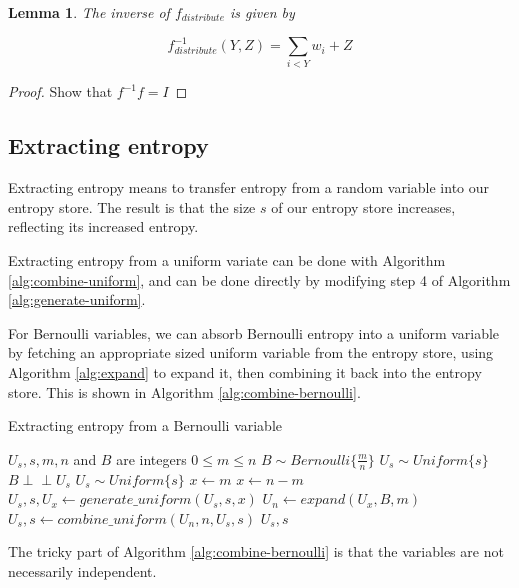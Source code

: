 \documentclass[12pt]{article}
\newtheorem{lemma}{Lemma}
\newcommand{\indep}{\perp\!\!\!\perp}
\begin{document}
\begin{lemma}
The inverse of $f_{distribute}$ is given by

    \begin{equation}
    f^{-1}_{distribute}(Y,Z) = \sum_{i<Y}w_i + Z
    \end{equation}
\end{lemma}

\begin{proof}
    Show that $f^{-1}f= I$

\end{proof}

\subsection {Extracting entropy}

Extracting entropy means to transfer entropy from a random variable into our entropy store. The result is that the size $s$ of our entropy store increases, reflecting its increased entropy.

Extracting entropy from a uniform variate can be done with Algorithm \ref{alg:combine-uniform}, and can be done directly by modifying step 4 of Algorithm \ref{alg:generate-uniform}.

For Bernoulli variables, we can absorb Bernoulli entropy into a uniform variable by fetching an appropriate sized uniform variable from the entropy store, using Algorithm \ref{alg:expand} to expand it, then combining it back into the entropy store. This is shown in Algorithm \ref{alg:combine-bernoulli}.

\begin{algorithm}
\caption{Extracting entropy from a Bernoulli variable}
\label{alg:combine-bernoulli}
\begin{algorithmic}[1]
    \Require $U_s, s, m, n$ and $B$ are integers
    \Require $0 \le m \le n$
    \Require $B \sim Bernoulli\{\frac{m}{n}\}$
    \Require $U_s \sim Uniform\{s\}$
    \Require $B \indep U_s$
    \Ensure $U_s \sim Uniform\{s\}$
        \State $x \gets m$
    \Else
        \State $x \gets n-m$
    \EndIf
    \State $U_s, s, U_x \gets generate\_uniform(U_s, s, x)$
    \State $U_n \gets expand(U_x, B, m)$
    \State $U_s, s \gets combine\_uniform(U_n, n, U_s, s)$
    \State \Return $U_s, s$
\EndProcedure
\end{algorithmic}
\end{algorithm}

The tricky part of Algorithm \ref{alg:combine-bernoulli} is that the variables are not necessarily independent.
\end{document}
